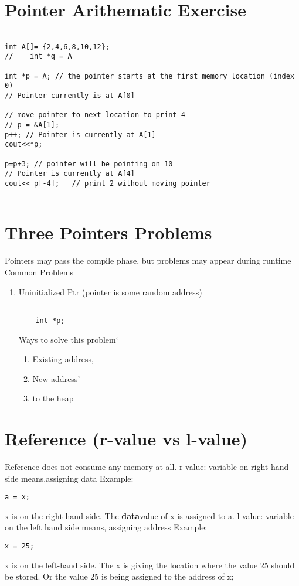 \documentclass[a4paper,12pt]{book}
\begin{document}
\section{Pointer Arithematic Exercise}
\begin{lstlisting}

int A[]= {2,4,6,8,10,12};
//    int *q = A

int *p = A; // the pointer starts at the first memory location (index 0)
// Pointer currently is at A[0]

// move pointer to next location to print 4
// p = &A[1];
p++; // Pointer is currently at A[1]
cout<<*p;

p=p+3; // pointer will be pointing on 10
// Pointer is currently at A[4]
cout<< p[-4];   // print 2 without moving pointer


\end{lstlisting}

\section{Three Pointers Problems}
Pointers may pass the compile phase, but problems may appear during runtime
Common Problems
\begin{enumerate}
	\item Uninitialized Ptr (pointer is some random address)
	\begin{verbatim}

	int *p;
	\end{verbatim}
	Ways to solve this problem`
	\begin{enumerate}
		\item Existing address,
		\item New address'
		\item to the heap
	\end{enumerate}
\end{enumerate}

\section{Reference (r-value vs l-value)}
Reference does not consume any memory at all.
r-value: variable on right hand side means,assigning data
Example:
\begin{lstlisting}
a = x;
\end{lstlisting}
x is on the right-hand side. The \textbf{data}value of x is assigned to a.
l-value: variable on the left hand side means, assigning address
Example:
\begin{lstlisting}
x = 25;
\end{lstlisting}
x is on the left-hand side. The x is giving the location where the value 25 should be stored. Or the value 25 is being assigned to the address of x;
\end{document}

